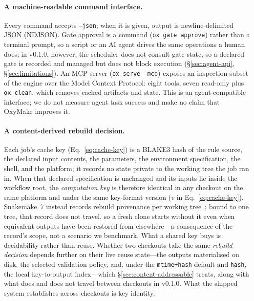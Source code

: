 \documentclass[12pt,a4paper]{article}
\newcommand{\code}[1]{{\texttt{\small\color{inlinecode}#1}}}
\begin{document}
\paragraph{A machine-readable command interface.}
Every command accepts \code{--json}; when it is given, output is
newline-delimited JSON (NDJSON). Gate approval is a command
(\code{ox gate approve}) rather than a terminal prompt, so a script or an
AI agent drives the same operations a human does; in v0.1.0, however, the
scheduler does not consult gate state, so a declared gate is recorded and
managed but does not block execution (\S\ref{sec:agent-api},
\S\ref{sec:limitations}). An MCP server (\code{ox serve --mcp}) exposes an
inspection subset of the engine over the Model Context Protocol: eight
tools, seven read-only plus \code{ox\_clean}, which removes cached
artifacts and state. This is an
agent-compatible interface; we do not measure agent task success and
make no claim that OxyMake improves it.

\paragraph{A content-derived rebuild decision.}
Each job's cache key (Eq.~\ref{eq:cache-key}) is a BLAKE3 hash of the
rule source, the declared input contents, the parameters, the
environment specification, the shell, and the platform; it records no
state private to the working tree the job ran in. When that declared
specification is unchanged and its inputs lie inside the workflow root,
the \emph{computation key} is therefore identical in any checkout on
the same platform and under the same key-format version ($v$ in
Eq.~\ref{eq:cache-key}).
Snakemake~7 instead records rebuild provenance per working
tree~\cite{kosterSnakemakeScalableBioinformatics2012,molderSustainableDataAnalysis2021};
bound to one tree, that record does not travel, so a fresh clone starts
without it even when equivalent outputs have been restored from
elsewhere---a consequence of the record's scope, not a scenario we
benchmark. What a shared key buys is decidability rather than reuse.
Whether two checkouts take the same \emph{rebuild decision} depends
further on their live reuse state---the outputs materialised on disk,
the selected validation policy, and, under the \code{mtime+hash} default
and \code{hash}, the local key-to-output index---which \S\ref{sec:content-addressable} treats, along with what
does and does not travel between checkouts in v0.1.0. What the shipped
system establishes across checkouts is key identity.
\end{document}
